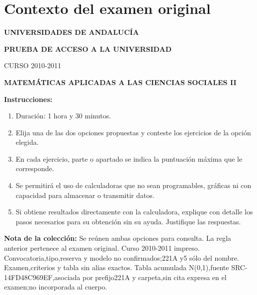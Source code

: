 \section*{Contexto del examen original}
\textbf{UNIVERSIDADES DE ANDALUCÍA}\par
\textbf{PRUEBA DE ACCESO A LA UNIVERSIDAD}\par
CURSO 2010-2011\par
\textbf{MATEMÁTICAS APLICADAS A LAS CIENCIAS SOCIALES II}

\textbf{Instrucciones:}
\begin{enumerate}[label=\textbf{\alph*)}]
  \item Duración: 1 hora y 30 minutos.
  \item Elija una de las dos opciones propuestas y conteste los ejercicios de la opción elegida.
  \item En cada ejercicio, parte o apartado se indica la puntuación máxima que le corresponde.
  \item Se permitirá el uso de calculadoras que no sean programables, gráficas ni con capacidad para almacenar o transmitir datos.
  \item Si obtiene resultados directamente con la calculadora, explique con detalle los pasos necesarios para su obtención sin su ayuda. Justifique las respuestas.
\end{enumerate}
\noindent\textbf{Nota de la colección:} Se reúnen ambas opciones para consulta. La regla anterior pertenece al examen original. Curso 2010-2011 impreso. Convocatoria,tipo,reserva y modelo no confirmados;221A y5 sólo del nombre. Examen,criterios y tabla sin alias exactos. Tabla acumulada N(0,1),fuente SRC-14FD48C969EF,asociada por prefijo221A y carpeta,sin cita expresa en el examen;no incorporada al cuerpo.
\par\medskip
